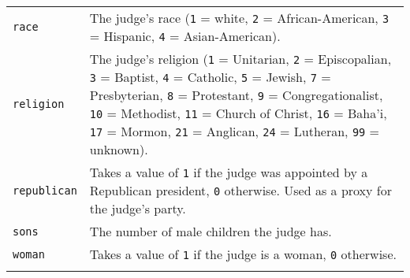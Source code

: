 \documentclass[]{article}
\begin{document}
\begin{longtable}[c]{@{}ll@{}}
\begin{minipage}[t]{0.34\columnwidth}
\texttt{race}
\end{minipage} & \begin{minipage}[t]{0.59\columnwidth}\raggedright
The judge's race (\texttt{1} = white, \texttt{2} = African-American,
\texttt{3} = Hispanic, \texttt{4} = Asian-American).
\end{minipage}
\\\addlinespace
\begin{minipage}[t]{0.34\columnwidth}\raggedright
\texttt{religion}
\end{minipage} & \begin{minipage}[t]{0.59\columnwidth}\raggedright
The judge's religion (\texttt{1} = Unitarian, \texttt{2} = Episcopalian,
\texttt{3} = Baptist, \texttt{4} = Catholic, \texttt{5} = Jewish,
\texttt{7} = Presbyterian, \texttt{8} = Protestant, \texttt{9} =
Congregationalist, \texttt{10} = Methodist, \texttt{11} = Church of
Christ, \texttt{16} = Baha'i, \texttt{17} = Mormon, \texttt{21} =
Anglican, \texttt{24} = Lutheran, \texttt{99} = unknown).
\end{minipage}
\\\addlinespace
\begin{minipage}[t]{0.34\columnwidth}\raggedright
\texttt{republican}
\end{minipage} & \begin{minipage}[t]{0.59\columnwidth}\raggedright
Takes a value of \texttt{1} if the judge was appointed by a Republican
president, \texttt{0} otherwise. Used as a proxy for the judge's party.
\end{minipage}
\\\addlinespace
\begin{minipage}[t]{0.34\columnwidth}\raggedright
\texttt{sons}
\end{minipage} & \begin{minipage}[t]{0.59\columnwidth}\raggedright
The number of male children the judge has.
\end{minipage}
\\\addlinespace
\begin{minipage}[t]{0.34\columnwidth}\raggedright
\texttt{woman}
\end{minipage} & \begin{minipage}[t]{0.59\columnwidth}\raggedright
Takes a value of \texttt{1} if the judge is a woman, \texttt{0}
otherwise.
\end{minipage}
\\\addlinespace
\begin{minipage}[t]{0.34\columnwidth}\raggedright

\end{minipage}
\end{longtable}
\end{document}

